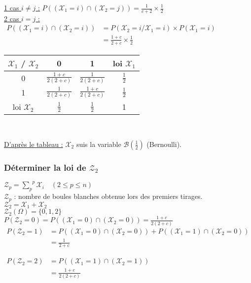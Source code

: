 \documentclass[a4paper, 12pt]{article}
\begin{document}
\begin{flushleft}
\underline{1 cas $i \neq j$ :} $P ((\mathcal{X}_1 = i) \cap (\mathcal{X}_2 = j)) = \frac{1}{c + 2} \times \frac{1}{2}$ \\
\underline{2 cas $i = j$ :} \\
$
\begin{aligned}
P ((\mathcal{X}_1 = i) \cap (\mathcal{X}_2 = i)) &= P (\mathcal{X}_2 = i / \mathcal{X}_1 = i) \times P (\mathcal{X}_1 = i) \\
&= \frac{1 + c}{2 + c} \times \frac{1}{2}
\end{aligned}
$
\end{flushleft}

{
\Large
\begin{center}
\begin{tabular}{c|cc|c}
	$\mathcal{X}_1$ / $\mathcal{X}_2$ & 0 & 1 & loi $\mathcal{X}_1$ \\
	\hline
	0 & $\frac{1 + c}{2 (2 + c)}$ & $\frac{1}{2 (2 + c)}$ & $\frac{1}{2}$ \\
	1 & $\frac{1}{2 (2 + c)}$ & $\frac{1 + c}{2 (2 + c)}$ & $\frac{1}{2}$ \\
	\hline
	loi $\mathcal{X}_2$ & $\frac{1}{2}$ & $\frac{1}{2}$ & 1 \\

\end{tabular}\\
\end{center}
}

\underline{D'après le tableau :} $\mathcal{X}_2$ suis la variable $\mathcal{B} (\frac{1}{2})$ (Bernoulli).


\subsubsection{Déterminer la loi de $\mathcal{Z}_2$}
\begin{flushleft}
$\mathcal{Z}_p = \overset{p}{\underset{p}{\sum}} \mathcal{X}_i \quad (2 \leq p \leq n)$ \\
$\mathcal{Z}_p$ : nombre de boules blanches obtenue lors des premiers tirages. \\
$\mathcal{Z}_2 = \mathcal{X}_1 + \mathcal{X}_2$ \\
$\mathcal{Z}_2 (\Omega) = \{0, 1, 2\}$ \\
$P (\mathcal{Z}_2 = 0) = P ((\mathcal{X}_1 = 0) \cap (\mathcal{X}_2 = 0)) = \frac{1 + c}{2 (2 + c)}$ \\
$
\begin{aligned}
P (\mathcal{Z}_2 = 1) &= P ((\mathcal{X}_1 = 0) \cap (\mathcal{X}_2 = 0)) + P ((\mathcal{X}_1 = 1) \cap (\mathcal{X}_2 = 0)) \\
&= \frac{1}{2 + c}
\end{aligned}
$

$
\begin{aligned}
P (\mathcal{Z}_2 = 2) &= P ((\mathcal{X}_1 = 1) \cap (\mathcal{X}_2 = 1)) \\
&= \frac{1 + c}{2 (2 + c)}
\end{aligned}
$
\end{flushleft}
\end{document}

